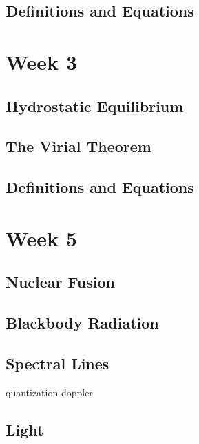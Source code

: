 \documentclass[a4paper,10pt]{article}
\begin{document}
\subsection{Definitions and Equations}


\newpage
\section{Week 3}

\subsection{Hydrostatic Equilibrium}

\subsection{The Virial Theorem}

\subsection{Definitions and Equations}



\newpage
\section{Week 5}

\subsection{Nuclear Fusion}

\subsection{Blackbody Radiation}

\subsection{Spectral Lines}
quantization
doppler

\subsection{Light}
\end{document}
